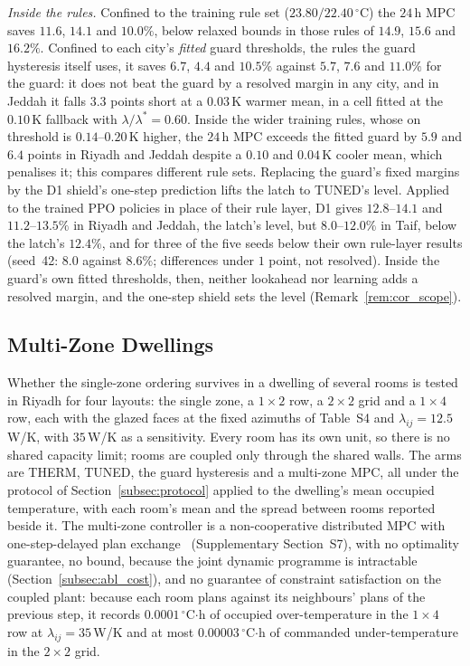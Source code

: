 \documentclass[3p,twocolumn,number]{elsarticle}
\newcommand{\lij}{\lambda_{ij}}
\begin{document}
\emph{Inside the rules.} Confined to the training rule set ($23.80/22.40\,^\circ$C) the $24\,$h MPC saves $11.6$, $14.1$ and $10.0\%$, below relaxed bounds in those rules of $14.9$, $15.6$ and $16.2\%$. Confined to each city's \emph{fitted} guard thresholds, the rules the guard hysteresis itself uses, it saves $6.7$, $4.4$ and $10.5\%$ against $5.7$, $7.6$ and $11.0\%$ for the guard: it does not beat the guard by a resolved margin in any city, and in Jeddah it falls $3.3$ points short at a $0.03\,$K warmer mean, in a cell fitted at the $0.10\,$K fallback with $\lambda/\lambda^\ast=0.60$. Inside the wider training rules, whose on threshold is $0.14$--$0.20\,$K higher, the $24\,$h MPC exceeds the fitted guard by $5.9$ and $6.4$ points in Riyadh and Jeddah despite a $0.10$ and $0.04\,$K cooler mean, which penalises it; this compares different rule sets. Replacing the guard's fixed margins by the D1 shield's one-step prediction lifts the latch to TUNED's level. Applied to the trained PPO policies in place of their rule layer, D1 gives $12.8$--$14.1$ and $11.2$--$13.5\%$ in Riyadh and Jeddah, the latch's level, but $8.0$--$12.0\%$ in Taif, below the latch's $12.4\%$, and for three of the five seeds below their own rule-layer results (seed~42: $8.0$ against $8.6\%$; differences under $1$ point, not resolved). Inside the guard's own fitted thresholds, then, neither lookahead nor learning adds a resolved margin, and the one-step shield sets the level (Remark~\ref{rem:cor_scope}).

\subsection{Multi-Zone Dwellings}
\label{subsec:multizone}
\label{subsec:res_all}

Whether the single-zone ordering survives in a dwelling of several rooms is tested in Riyadh for four layouts: the single zone, a $1\times2$ row, a $2\times2$ grid and a $1\times4$ row, each with the glazed faces at the fixed azimuths of Table~S4 and $\lij=12.5\,$W/K, with $35\,$W/K as a sensitivity. Every room has its own unit, so there is no shared capacity limit; rooms are coupled only through the shared walls. The arms are THERM, TUNED, the guard hysteresis and a multi-zone MPC, all under the protocol of Section~\ref{subsec:protocol} applied to the dwelling's mean occupied temperature, with each room's mean and the spread between rooms reported beside it. The multi-zone controller is a non-cooperative distributed MPC with one-step-delayed plan exchange~\cite{Scattolini2009} (Supplementary Section~S7), with no optimality guarantee, no bound, because the joint dynamic programme is intractable (Section~\ref{subsec:abl_cost}), and no guarantee of constraint satisfaction on the coupled plant: because each room plans against its neighbours' plans of the previous step, it records $0.0001\,^\circ$C$\cdot$h of occupied over-temperature in the $1\times4$ row at $\lij=35\,$W/K and at most $0.00003\,^\circ$C$\cdot$h of commanded under-temperature in the $2\times2$ grid.
\end{document}
